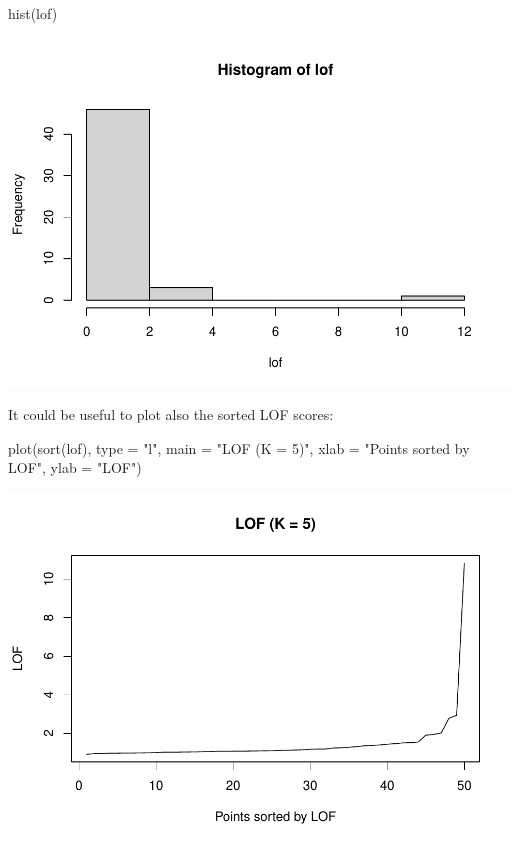 \documentclass[
]{article}
\newenvironment{Shaded}{\begin{snugshade}}{\end{snugshade}}
\newcommand{\AttributeTok}[1]{\textcolor[rgb]{0.77,0.63,0.00}{#1}}
\newcommand{\FunctionTok}[1]{\textcolor[rgb]{0.00,0.00,0.00}{#1}}
\newcommand{\NormalTok}[1]{#1}
\newcommand{\StringTok}[1]{\textcolor[rgb]{0.31,0.60,0.02}{#1}}
\begin{document}
\begin{Shaded}
\begin{Highlighting}[]
\FunctionTok{hist}\NormalTok{(lof)}
\end{Highlighting}
\end{Shaded}

\includegraphics{clustering_files/figure-latex/unnamed-chunk-17-1.pdf}

It could be useful to plot also the sorted LOF scores:

\begin{Shaded}
\begin{Highlighting}[]
\FunctionTok{plot}\NormalTok{(}\FunctionTok{sort}\NormalTok{(lof), }\AttributeTok{type =} \StringTok{"l"}\NormalTok{,  }\AttributeTok{main =} \StringTok{"LOF (K = 5)"}\NormalTok{,}
  \AttributeTok{xlab =} \StringTok{"Points sorted by LOF"}\NormalTok{, }\AttributeTok{ylab =} \StringTok{"LOF"}\NormalTok{)}
\end{Highlighting}
\end{Shaded}

\includegraphics{clustering_files/figure-latex/unnamed-chunk-18-1.pdf}
\end{document}
